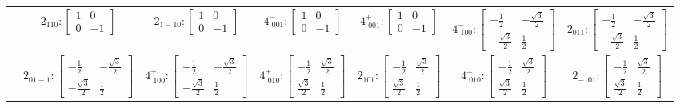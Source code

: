 \documentclass[fleqn,8pt,landscape]{jsarticle}
\begin{document}
\begin{longtable}{ccccccc}
& $ 2{}_{110}:\begin{bmatrix} 1 & 0 \\ 0 & -1 \end{bmatrix} $ & $ 2{}_{1-10}:\begin{bmatrix} 1 & 0 \\ 0 & -1 \end{bmatrix} $ & $ 4^{-}_{\,\,001}:\begin{bmatrix} 1 & 0 \\ 0 & -1 \end{bmatrix} $ & $ 4^{+}_{\,\,001}:\begin{bmatrix} 1 & 0 \\ 0 & -1 \end{bmatrix} $ & $ 4^{-}_{\,\,100}:\begin{bmatrix} - \frac{1}{2} & - \frac{\sqrt{3}}{2} \\ - \frac{\sqrt{3}}{2} & \frac{1}{2} \end{bmatrix} $ & $ 2{}_{011}:\begin{bmatrix} - \frac{1}{2} & - \frac{\sqrt{3}}{2} \\ - \frac{\sqrt{3}}{2} & \frac{1}{2} \end{bmatrix} $ \\
& $ 2{}_{01-1}:\begin{bmatrix} - \frac{1}{2} & - \frac{\sqrt{3}}{2} \\ - \frac{\sqrt{3}}{2} & \frac{1}{2} \end{bmatrix} $ & $ 4^{+}_{\,\,100}:\begin{bmatrix} - \frac{1}{2} & - \frac{\sqrt{3}}{2} \\ - \frac{\sqrt{3}}{2} & \frac{1}{2} \end{bmatrix} $ & $ 4^{+}_{\,\,010}:\begin{bmatrix} - \frac{1}{2} & \frac{\sqrt{3}}{2} \\ \frac{\sqrt{3}}{2} & \frac{1}{2} \end{bmatrix} $ & $ 2{}_{101}:\begin{bmatrix} - \frac{1}{2} & \frac{\sqrt{3}}{2} \\ \frac{\sqrt{3}}{2} & \frac{1}{2} \end{bmatrix} $ & $ 4^{-}_{\,\,010}:\begin{bmatrix} - \frac{1}{2} & \frac{\sqrt{3}}{2} \\ \frac{\sqrt{3}}{2} & \frac{1}{2} \end{bmatrix} $ & $ 2{}_{-101}:\begin{bmatrix} - \frac{1}{2} & \frac{\sqrt{3}}{2} \\ \frac{\sqrt{3}}{2} & \frac{1}{2} \end{bmatrix} $ \\

\end{longtable}
\end{document}
